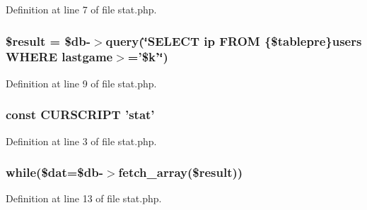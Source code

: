 Definition at line 7 of file stat.\+php.

\hypertarget{stat_8php_a112ef069ddc0454086e3d1e6d8d55d07}{
\subsubsection[{\$result}]{\setlength{\rightskip}{0pt plus 5cm}\${\bf result} = \$db-\/$>$query(\char`\"{}S\+E\+L\+E\+C\+T ip F\+R\+O\+M \{\$tablepre\}users W\+H\+E\+R\+E lastgame$>$='\$k'\char`\"{})}}\label{stat_8php_a112ef069ddc0454086e3d1e6d8d55d07}


Definition at line 9 of file stat.\+php.

\hypertarget{stat_8php_a39c39f525eceb86cabc338804f230e80}{
\subsubsection[{C\+U\+R\+S\+C\+R\+I\+P\+T}]{\setlength{\rightskip}{0pt plus 5cm}const C\+U\+R\+S\+C\+R\+I\+P\+T 'stat'}}\label{stat_8php_a39c39f525eceb86cabc338804f230e80}


Definition at line 3 of file stat.\+php.

\hypertarget{stat_8php_ab54633a8fada54bedd1fe3c2635cfaeb}{
\subsubsection[{while}]{\setlength{\rightskip}{0pt plus 5cm}while(\$dat=\$db-\/$>$fetch\+\_\+array(\${\bf result}))}}\label{stat_8php_ab54633a8fada54bedd1fe3c2635cfaeb}


Definition at line 13 of file stat.\+php.

